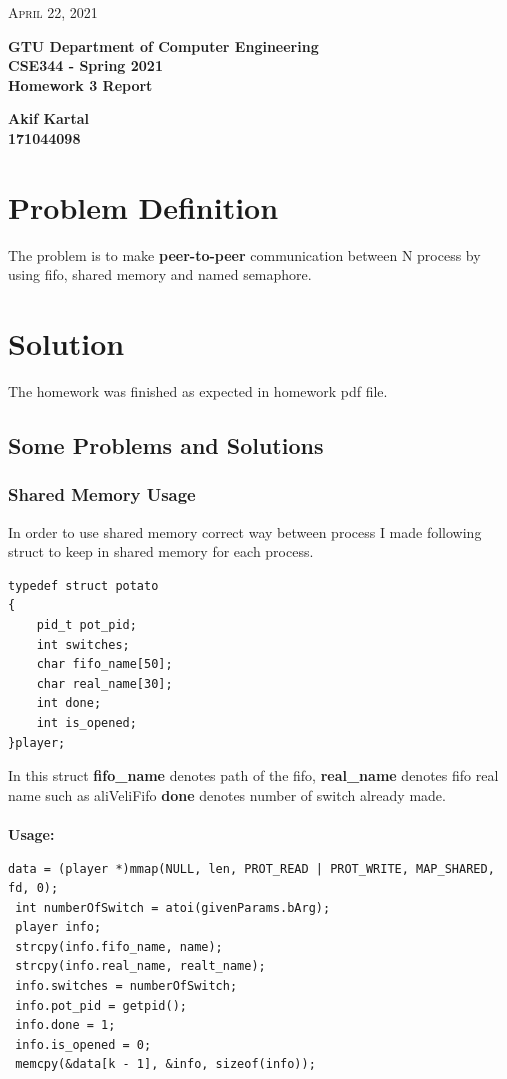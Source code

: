 \documentclass{article}
\begin{document}
\begin{titlepage}

	\begin{flushright}
	\textsc{\large April 22, 2021} \\
	\end{flushright}
	\begin{center}
	\Large{\bfseries GTU Department of Computer Engineering \\ CSE344 - Spring 2021 \\ Homework 3 Report  } \\
	\end{center}
	\vspace*{\fill}
	\begin{center}
	\Large{\bfseries Akif Kartal \\ 171044098 }
	\end{center}
	\vspace*{\fill}

\end{titlepage}

\cleardoublepage
\section{Problem Definition}
The problem is to make \textbf{peer-to-peer} communication between N process by using fifo, shared memory and named semaphore. 

\section{Solution}
The homework was finished as expected in homework pdf file. 
\subsection{Some Problems and Solutions}
\subsubsection{Shared Memory Usage}
In order to use shared memory correct way between process I made following struct to keep in shared memory for each process.
\begin{lstlisting}[style=CStyle]
typedef struct potato
{
    pid_t pot_pid;
    int switches;
    char fifo_name[50];
    char real_name[30];
    int done;
    int is_opened;
}player;
\end{lstlisting}
In this struct \textbf{fifo\_name} denotes path of the fifo, \textbf{real\_name} denotes fifo real name such as aliVeliFifo \textbf{done} denotes number of 
switch already made.\\ \\
\textbf{Usage:}
\begin{lstlisting}[style=CStyle]
 data = (player *)mmap(NULL, len, PROT_READ | PROT_WRITE, MAP_SHARED, fd, 0);
 int numberOfSwitch = atoi(givenParams.bArg);
 player info;
 strcpy(info.fifo_name, name);
 strcpy(info.real_name, realt_name);
 info.switches = numberOfSwitch;
 info.pot_pid = getpid();
 info.done = 1;
 info.is_opened = 0;
 memcpy(&data[k - 1], &info, sizeof(info)); 
\end{lstlisting}
\end{document}
